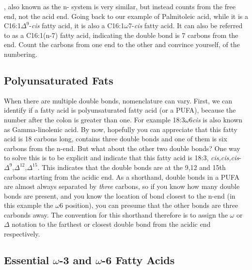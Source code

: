 \documentclass{tufte-handout}
\begin{document}
, also known as the n- system is very similar, but instead counts from the free end, not the acid end.  Going back to our example of Palmitoleic acid, while it is a C16:1$\Delta^9$-\textit{cis} fatty acid, it is also a C16:1$\omega$7-\textit{cis} fatty acid.  It can also be referred to as a C16:1(n-7) fatty acid, indicating the double bond is 7 carbons from the end.  Count the carbons from one end to the other and convince yourself, of the numbering.

\subsection{Polyunsaturated Fats}

When there are multiple double bonds, nomenclature can vary.  First, we can identify if a fatty acid is polyunsaturated fatty acid (or a PUFA), because the number after the colon is greater than one.  For example 18:3$\omega$6\textit{cis} is also known as Gamma-linolenic acid.  By now, hopefully you can appreciate that this fatty acid is 18 carbons long, contains three double bonds and one of them is six carbons from the n-end.  But what about the other two double bonds?  One way to solve this is to be explicit and indicate that this fatty acid is 18:3, \textit{cis,cis,cis}-$\Delta^9$,$\Delta^{12}$,$\Delta^{15}$.  This indicates that the double bonds are at the 9,12 and 15th carbons starting from the acidic end.  As a shorthand, double bonds in a PUFA are almost always separated by \emph{three} carbons, so if you know how many double bonds are present, and you know the location of bond closest to the n-end (in this example the $\omega$6 position), you can presume that the other bonds are three carbonds away.  The convention for this shorthand therefore is to assign the $\omega$ or $\Delta$ notation to the farthest or closest double bond from the acidic end respectively.

\subsection{Essential $\omega$-3  and $\omega$-6 Fatty Acids}
\end{document}

